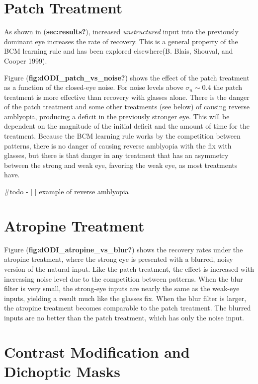 \documentclass[
  letterpaper,
]{book}
\begin{document}
\hypertarget{patch-treatment-1}{%
\section{Patch Treatment}\label{patch-treatment-1}}

As shown in (\textbf{sec:results?}), increased \emph{unstructured} input
into the previously dominant eye increases the rate of recovery. This is
a general property of the BCM learning rule and has been explored
elsewhere(B. Blais, Shouval, and Cooper 1999).

Figure (\textbf{fig:dODI\_patch\_vs\_noise?}) shows the effect of the
patch treatment as a function of the closed-eye noise. For noise levels
above \(\sigma_n \sim 0.4\) the patch treatment is more effective than
recovery with glasses alone. There is the danger of the patch treatment
and some other treatments (see below) of causing reverse amblyopia,
producing a deficit in the previously stronger eye. This will be
dependent on the magnitude of the initial deficit and the amount of time
for the treatment. Because the BCM learning rule works by the
competition between patterns, there is no danger of causing reverse
amblyopia with the fix with glasses, but there is that danger in any
treatment that has an asymmetry between the strong and weak eye,
favoring the weak eye, as most treatments have.

\#todo - {[} {]} example of reverse amblyopia

\hypertarget{atropine-treatment-1}{%
\section{Atropine Treatment}\label{atropine-treatment-1}}

Figure (\textbf{fig:dODI\_atropine\_vs\_blur?}) shows the recovery rates
under the atropine treatment, where the strong eye is presented with a
blurred, noisy version of the natural input. Like the patch treatment,
the effect is increased with increasing noise level due to the
competition between patterns. When the blur filter is very small, the
strong-eye inputs are nearly the same as the weak-eye inputs, yielding a
result much like the glasses fix. When the blur filter is larger, the
atropine treatment becomes comparable to the patch treatment. The
blurred inputs are no better than the patch treatment, which has only
the noise input.

\hypertarget{contrast-modification-and-dichoptic-masks}{%
\section{Contrast Modification and Dichoptic
Masks}\label{contrast-modification-and-dichoptic-masks}}
\end{document}
